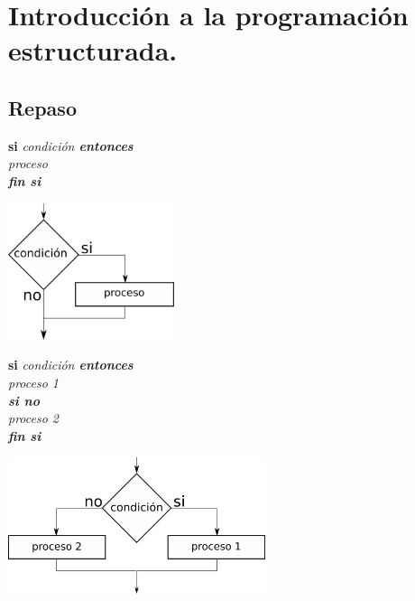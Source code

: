 \section{Introducción a la programación estructurada.}
\setcounter{subsection}{3}

\subsection{Repaso}

\begin{minipage}{0.5\textwidth}
  \textbf{si} \it{condición} \textbf{entonces}\\
  \hspace*{10mm}\it{proceso}\\
  \textbf{fin si}\\
\end{minipage}
\begin{minipage}{0.5\textwidth}
\center
  \includegraphics[height=40mm]{img/if.pdf}
\end{minipage}

\vspace{10mm}

\begin{minipage}{0.5\textwidth}
  \textbf{si} \it{condición} \textbf{entonces}\\
  \hspace*{10mm}\it{proceso 1}\\
  \textbf{si no}\\
  \hspace*{10mm}\it{proceso 2}\\
  \textbf{fin si}\\
\end{minipage}
\begin{minipage}{0.5\textwidth}
  \includegraphics[height=40mm]{img/if_else.pdf}
\end{minipage}

